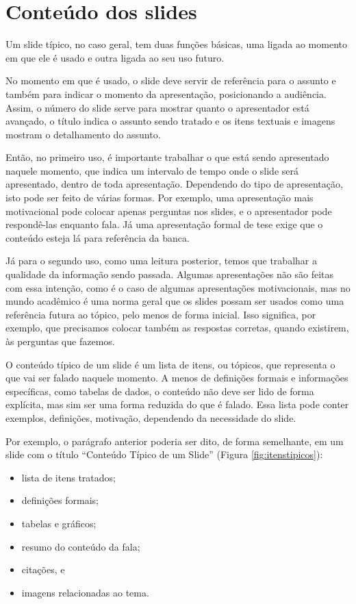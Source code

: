 \section{Conteúdo dos slides}

Um slide típico, no caso geral, tem duas funções básicas, uma ligada ao momento em que ele é usado e outra ligada ao seu uso futuro.

No momento em que é usado, o slide deve servir de referência para o assunto e também para indicar o momento da apresentação, posicionando a audiência.
Assim, o número do slide serve para mostrar quanto o apresentador está avançado, o título indica o assunto sendo tratado e os itens textuais e imagens mostram o detalhamento do assunto.

Então, no primeiro uso, é importante trabalhar o que está sendo apresentado naquele momento, que indica um intervalo de tempo onde o slide será apresentado, dentro de toda apresentação.
Dependendo do tipo de apresentação, isto pode ser feito de várias formas.
Por exemplo, uma apresentação mais motivacional pode colocar apenas perguntas nos slides, e o apresentador pode respondê-las enquanto fala.
Já uma apresentação formal de tese exige que o conteúdo esteja lá para referência da banca.

Já para o segundo uso, como uma leitura posterior, temos que trabalhar a qualidade da informação sendo passada.
 Algumas apresentações não são feitas com essa intenção, como é o caso de algumas apresentações motivacionais, mas no mundo acadêmico é uma norma geral que os slides possam ser usados como uma referência futura ao tópico, pelo menos de forma inicial.
 Isso significa, por exemplo, que precisamos colocar também as respostas corretas, quando existirem, às perguntas que fazemos.

O conteúdo típico de um slide é um lista de itens, ou tópicos,  que representa o que vai ser falado naquele momento.
A menos de definições formais e informações específicas, como tabelas de dados, o conteúdo não deve ser lido de forma explícita, mas sim ser uma forma reduzida do que é falado.
Essa lista pode conter exemplos, definições, motivação, dependendo da necessidade do slide.

Por exemplo, o parágrafo anterior poderia ser dito, de forma semelhante, em um slide com o título ``Conteúdo Típico de um Slide'' (Figura \ref{fig:itenstipicos}):
\begin{itemize}
    \item lista de itens tratados;
    \item definições formais;
    \item tabelas e gráficos;
    \item resumo do conteúdo da fala;
    \item citações, e
    \item imagens relacionadas ao tema.
\end{itemize}

